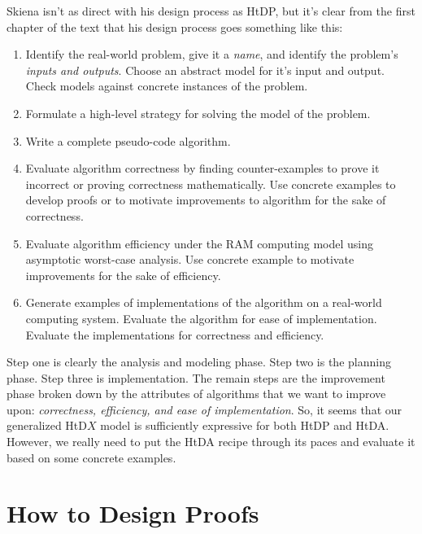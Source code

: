 \documentclass[]{tufte-handout}
\begin{document}
Skiena isn't as direct with his design process as HtDP, but it's clear from the first chapter of the text that his design process goes something like this:
\begin{enumerate}
\item Identify the real-world problem, give it a \textit{name}, and identify the problem's \textit{inputs and outputs}. Choose an abstract model for it's input and output. Check models against concrete instances of the problem. 
\item Formulate a high-level strategy for solving the model of the problem.
\item Write a complete pseudo-code algorithm. 
\item Evaluate algorithm correctness by finding counter-examples to prove it incorrect or proving correctness mathematically. Use concrete examples to develop proofs or to motivate improvements to algorithm for the sake of correctness.
\item Evaluate algorithm efficiency under the RAM computing model using asymptotic worst-case analysis. Use concrete example to motivate improvements for the sake of efficiency.
\item Generate examples of implementations of the algorithm on a real-world computing system. Evaluate the algorithm for ease of implementation. Evaluate the implementations for correctness and efficiency.
\end{enumerate}

Step one is clearly the analysis and modeling phase. Step two is the planning phase. Step three is implementation. The remain steps are the improvement phase broken down by the attributes of algorithms that we want to improve upon: \textit{correctness, efficiency, and ease of implementation}. So, it seems that our generalized HtD$X$ model is sufficiently expressive for both HtDP and HtDA.  However, we really need to put the HtDA recipe through its paces and evaluate it based on some concrete examples.

\section{How to Design Proofs}
\end{document}
